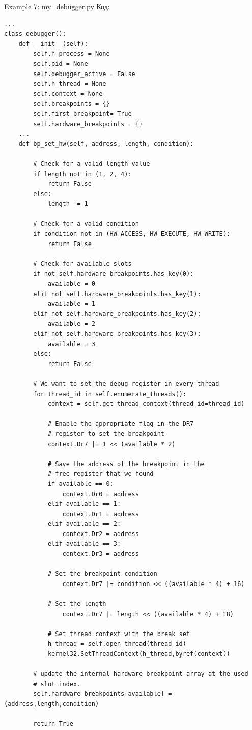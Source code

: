 \documentclass[12pt, a4paper, oneside]{book}
\begin{document}
Example 7: my\_debugger.py
Код:
\begin{verbatim}
...
class debugger():
    def __init__(self):
        self.h_process = None
        self.pid = None
        self.debugger_active = False
        self.h_thread = None
        self.context = None
        self.breakpoints = {}
        self.first_breakpoint= True
        self.hardware_breakpoints = {}
    ...
    def bp_set_hw(self, address, length, condition):

        # Check for a valid length value
        if length not in (1, 2, 4):
            return False
        else:
            length -= 1

        # Check for a valid condition
        if condition not in (HW_ACCESS, HW_EXECUTE, HW_WRITE):
            return False

        # Check for available slots
        if not self.hardware_breakpoints.has_key(0):
            available = 0
        elif not self.hardware_breakpoints.has_key(1):
            available = 1
        elif not self.hardware_breakpoints.has_key(2):
            available = 2
        elif not self.hardware_breakpoints.has_key(3):
            available = 3
        else:
            return False

        # We want to set the debug register in every thread
        for thread_id in self.enumerate_threads():
            context = self.get_thread_context(thread_id=thread_id)

            # Enable the appropriate flag in the DR7
            # register to set the breakpoint
            context.Dr7 |= 1 << (available * 2)

            # Save the address of the breakpoint in the
            # free register that we found
            if available == 0:
                context.Dr0 = address
            elif available == 1:
                context.Dr1 = address
            elif available == 2:
                context.Dr2 = address
            elif available == 3:
                context.Dr3 = address

            # Set the breakpoint condition
                context.Dr7 |= condition << ((available * 4) + 16)

            # Set the length
                context.Dr7 |= length << ((available * 4) + 18)

            # Set thread context with the break set
            h_thread = self.open_thread(thread_id)
            kernel32.SetThreadContext(h_thread,byref(context))

        # update the internal hardware breakpoint array at the used
        # slot index.
        self.hardware_breakpoints[available] = (address,length,condition)

        return True
\end{verbatim}
\end{document}

